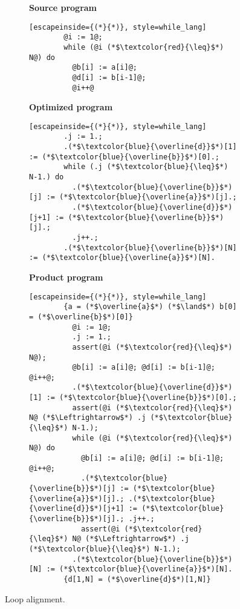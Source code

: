 \begin{figure}
  \centering
  \begin{subfigure}[b]{0.45\textwidth}
    \begin{minipage}[t]{\linewidth}
      \textbf{Source program}
      \begin{lstlisting}[escapeinside={(*}{*)}, style=while_lang]
        @i := 1@; 
        while (@i (*$\textcolor{red}{\leq}$*) N@) do
          @b[i] := a[i]@;
          @d[i] := b[i-1]@;
          @i++@
      \end{lstlisting}
    \end{minipage}
  \end{subfigure}
  \hfill
  \begin{subfigure}[b]{0.45\textwidth}
    \begin{minipage}[t]{\linewidth}
      \textbf{Optimized program}
      \begin{lstlisting}[escapeinside={(*}{*)}, style=while_lang]
        .j := 1.;
        .(*$\textcolor{blue}{\overline{d}}$*)[1] := (*$\textcolor{blue}{\overline{b}}$*)[0].;
        while (.j (*$\textcolor{blue}{\leq}$*) N-1.) do
          .(*$\textcolor{blue}{\overline{b}}$*)[j] := (*$\textcolor{blue}{\overline{a}}$*)[j].;
          .(*$\textcolor{blue}{\overline{d}}$*)[j+1] := (*$\textcolor{blue}{\overline{b}}$*)[j].;
          .j++.;
        .(*$\textcolor{blue}{\overline{b}}$*)[N] := (*$\textcolor{blue}{\overline{a}}$*)[N].
      \end{lstlisting}
    \end{minipage}
  \end{subfigure}
  \hfill
  \begin{subfigure}[b]{0.9\textwidth}
    \begin{minipage}[t]{\linewidth}
      \textbf{Product program}
      \begin{lstlisting}[escapeinside={(*}{*)}, style=while_lang]
        {a = (*$\overline{a}$*) (*$\land$*) b[0] = (*$\overline{b}$*)[0]}
          @i := 1@; 
          .j := 1.;
          assert(@i (*$\textcolor{red}{\leq}$*) N@);
          @b[i] := a[i]@; @d[i] := b[i-1]@; @i++@;
          .(*$\textcolor{blue}{\overline{d}}$*)[1] := (*$\textcolor{blue}{\overline{b}}$*)[0].;
          assert(@i (*$\textcolor{red}{\leq}$*) N@ (*$\Leftrightarrow$*) .j (*$\textcolor{blue}{\leq}$*) N-1.);
          while (@i (*$\textcolor{red}{\leq}$*) N@) do
            @b[i] := a[i]@; @d[i] := b[i-1]@; @i++@;
            .(*$\textcolor{blue}{\overline{b}}$*)[j] := (*$\textcolor{blue}{\overline{a}}$*)[j].; .(*$\textcolor{blue}{\overline{d}}$*)[j+1] := (*$\textcolor{blue}{\overline{b}}$*)[j].; .j++.;
            assert(@i (*$\textcolor{red}{\leq}$*) N@ (*$\Leftrightarrow$*) .j (*$\textcolor{blue}{\leq}$*) N-1.);
          .(*$\textcolor{blue}{\overline{b}}$*)[N] := (*$\textcolor{blue}{\overline{a}}$*)[N].
        {d[1,N] = (*$\overline{d}$*)[1,N]}
      \end{lstlisting}
    \end{minipage}
  \end{subfigure}
  \caption{Loop alignment.}
  \label{fig:loop_alignment}
\end{figure}

